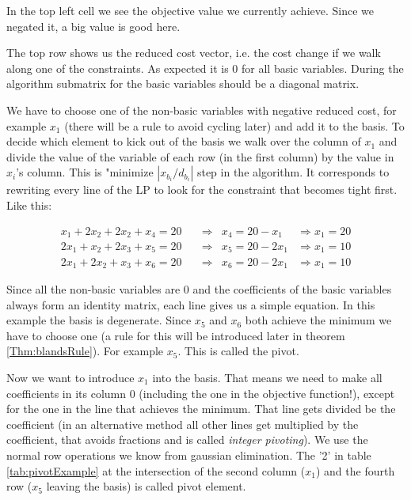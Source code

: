 \begin{Ex}
In the top left cell we see the objective value we currently achieve. Since we negated it, a big value is good here.

The top row shows us the reduced cost vector, i.e. the cost change if we walk along one of the constraints. As expected it is 0 for all basic variables. During the algorithm submatrix for the basic variables should be a diagonal matrix. 

We have to choose one of the non-basic variables with negative reduced cost, for example $x_1$ (there will be a rule to avoid cycling later) and add it to the basis. To decide which element to kick out of the basis we walk over the column of $x_1$ and divide the value of the variable of each row (in the first column) by the value in $x_i$'s column. This is "minimize $|x_{b_i}/d_{b_i}|$ step in the algorithm. It corresponds to rewriting every line of the LP to look for the constraint that becomes tight first. Like this:

\begin{align*}
x_1 + 2 x_2 + 2 x_2 + x_4 = 20 & \quad \Rightarrow & x_4 = 20 - x_1    & \Rightarrow x_1 = 20\\
2 x_1 +x_2 + 2 x_3 + x_5 = 20  & \quad \Rightarrow & x_5 = 20 - 2 x_1  & \Rightarrow x_1 = 10 \\
2 x_1 + 2 x_2 + x_3 + x_6 = 20 & \quad \Rightarrow & x_6 = 20 - 2 x_1  &\Rightarrow x_1 = 10
\end{align*}

Since all the non-basic variables are $0$ and the coefficients of the basic variables always form an identity matrix, each line gives us a simple equation. In this example the basis is degenerate. Since $x_5$ and $x_6$ both achieve the minimum we have to choose one (a rule for this will be introduced later in theorem \ref{Thm:blandsRule}). For example $x_5$. This is called the pivot.

Now we want to introduce $x_1$ into the basis. That means we need to make all coefficients in its column 0 (including the one in the objective function!), except for the one in the line that achieves the minimum. That line gets divided be the coefficient (in an alternative method all other lines get multiplied by the coefficient, that avoids fractions and is called \emph{integer pivoting}). We use the normal row operations we know from gaussian elimination. The '2' in table \ref{tab:pivotExample} at the intersection of the second column ($x_1$) and the fourth row ($x_5$ leaving the basis) is called pivot element.


\end{Ex}
